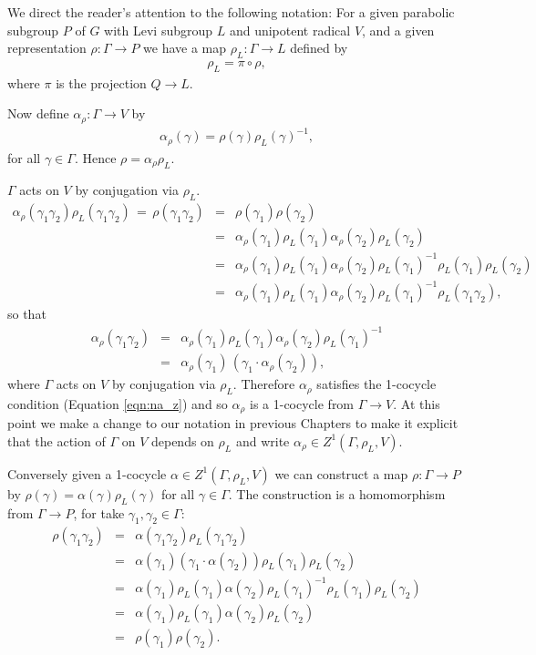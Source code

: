 We direct the reader's attention to the following notation: For a given parabolic subgroup $P$ of $G$ with Levi subgroup $L$ and unipotent radical $V$, and a given representation $\rho:\Gamma\rightarrow P$ we have a map $\rho_L:\Gamma\rightarrow L$ defined by
\begin{eqnarray}
  \rho_L = \pi \circ \rho,
  \label{eqn:proj_l}
\end{eqnarray}
where $\pi$ is the projection $Q \rightarrow L$.

Now define $\alpha_\rho:\Gamma\rightarrow V$ by 
\begin{eqnarray*}
  \alpha_\rho(\gamma) = \rho(\gamma)\rho_L(\gamma)^{-1},
\end{eqnarray*}
for all $\gamma\in\Gamma$. Hence $\rho = \alpha_\rho\rho_L$.

$\Gamma$ acts on $V$ by conjugation via $\rho_L$.
\begin{eqnarray*}
	\alpha_\rho(\gamma_1\gamma_2)\rho_L(\gamma_1\gamma_2) \,=\, \rho(\gamma_1\gamma_2) 
		&=& \rho(\gamma_1)\rho(\gamma_2) \\
		&=& \alpha_\rho(\gamma_1)\rho_L(\gamma_1)\alpha_\rho(\gamma_2)\rho_L(\gamma_2) \\
		&=& \alpha_\rho(\gamma_1)\rho_L(\gamma_1)\alpha_\rho(\gamma_2)\rho_L(\gamma_1)^{-1}\rho_L(\gamma_1)\rho_L(\gamma_2)\\
		&=&\alpha_\rho(\gamma_1)\rho_L(\gamma_1)\alpha_\rho(\gamma_2)\rho_L(\gamma_1)^{-1}\rho_L(\gamma_1\gamma_2),
\end{eqnarray*}
so that
\begin{eqnarray*}
	\alpha_\rho(\gamma_1\gamma_2) &=&
	\alpha_\rho(\gamma_1)\rho_L(\gamma_1)\alpha_\rho(\gamma_2)\rho_L(\gamma_1)^{-1}\\
	&=& \alpha_\rho(\gamma_1)\,\left(\gamma_1\cdot\alpha_\rho(\gamma_2)\right),
\end{eqnarray*}
where $\Gamma$ acts on $V$ by conjugation via $\rho_L$. Therefore $\alpha_\rho$ satisfies the 1-cocycle condition (Equation \ref{eqn:na_z}) and so $\alpha_\rho$ is a 1-cocycle from $\Gamma \rightarrow V$. At this point we make a change to our notation in previous Chapters to make it explicit that the action of $\Gamma$ on $V$ depends on $\rho_L$ and write $\alpha_\rho \in Z^1(\Gamma, \rho_L, V)$.

Conversely given a 1-cocycle $\alpha\in Z^1(\Gamma, \rho_L, V)$ we can construct a map $\rho:\Gamma\rightarrow P$ by $\rho(\gamma) = \alpha(\gamma)\rho_L(\gamma)$ for all $\gamma\in \Gamma$. The construction is a homomorphism from $\Gamma \rightarrow P$, for take $\gamma_1, \gamma_2 \in \Gamma$:
\begin{eqnarray*}
  \rho(\gamma_1 \gamma_2) &=& \alpha(\gamma_1 \gamma_2) \rho_L(\gamma_1 \gamma_2) \\
  &=& \alpha(\gamma_1)(\gamma_1 \cdot \alpha(\gamma_2)) \rho_L(\gamma_1) \rho_L(\gamma_2) \\
  &=& \alpha(\gamma_1) \rho_L(\gamma_1) \alpha(\gamma_2) \rho_L(\gamma_1)^{-1} \rho_L(\gamma_1) \rho_L(\gamma_2) \\
  &=& \alpha(\gamma_1) \rho_L(\gamma_1) \alpha(\gamma_2) \rho_L(\gamma_2) \\
  &=& \rho(\gamma_1) \rho(\gamma_2).
\end{eqnarray*}

